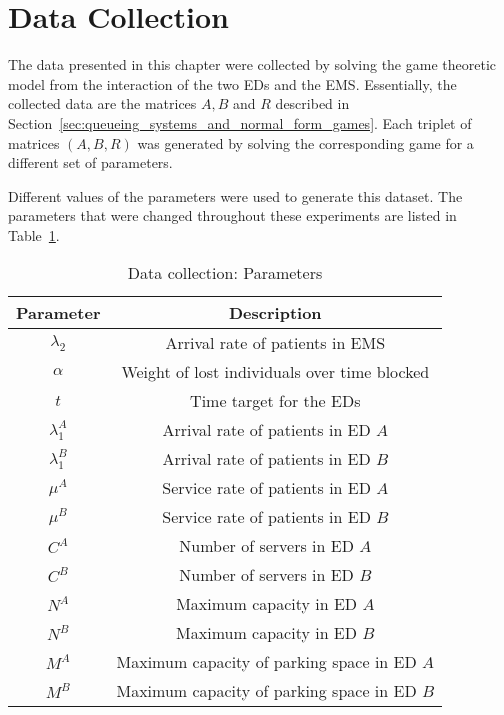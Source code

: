 \section{Data Collection}\label{sec:data_collection}

The data presented in this chapter were collected by solving the game theoretic
model from the interaction of the two EDs and the EMS.
Essentially, the collected data are the matrices \(A, B\) and \(R\) described
in Section~\ref{sec:queueing_systems_and_normal_form_games}.
Each triplet of matrices \((A, B, R)\) was generated by solving the
corresponding game for a different set of parameters.

Different values of the parameters were used to generate this dataset.
The parameters that were changed throughout these experiments are listed in
Table~\ref{tab:data_collection_parameters}.

\begin{table}[H]
    \centering
    \caption{Data collection: Parameters}
    \begin{tabular}{|c|c|}
        \hline
        Parameter & Description \\
        \hline
        \(\lambda_2\) & Arrival rate of patients in EMS \\
        \(\alpha\) & Weight of lost individuals over time blocked \\
        \(t\) & Time target for the EDs \\
        \(\lambda_1^A\) & Arrival rate of patients in ED \(A\) \\
        \(\lambda_1^B\) & Arrival rate of patients in ED \(B\) \\
        \(\mu^A\) & Service rate of patients in ED \(A\) \\
        \(\mu^B\) & Service rate of patients in ED \(B\) \\
        \(C^A\) & Number of servers in ED \(A\) \\
        \(C^B\) & Number of servers in ED \(B\) \\
        \(N^A\) & Maximum capacity in ED \(A\) \\
        \(N^B\) & Maximum capacity in ED \(B\) \\
        \(M^A\) & Maximum capacity of parking space in ED \(A\) \\
        \(M^B\) & Maximum capacity of parking space in ED \(B\) \\
        \hline
    \end{tabular}
    \label{tab:data_collection_parameters}
\end{table}

